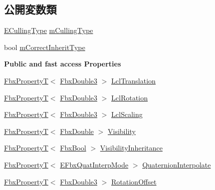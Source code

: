 \subsection*{公開変数類}
\begin{DoxyCompactItemize}
\item 
\hyperlink{class_fbx_node_afdb6d2c1708802d8b175f5094ff06046}{E\+Culling\+Type} \hyperlink{class_fbx_node_a897f88d6e23b1680d9452cd21b3d8add}{m\+Culling\+Type}
\item 
bool \hyperlink{class_fbx_node_acd21e92423faa682ac9270866e436924}{m\+Correct\+Inherit\+Type}
\end{DoxyCompactItemize}
\begin{Indent}\textbf{ Public and fast access Properties}\par
\begin{DoxyCompactItemize}
\item 
\hyperlink{class_fbx_property_t}{Fbx\+PropertyT}$<$ \hyperlink{fbxtypes_8h_ae0a96f14cde566774c7553aa7523b7a7}{Fbx\+Double3} $>$ \hyperlink{class_fbx_node_a949dfdc30869095ed26efa68674a9142}{Lcl\+Translation}
\item 
\hyperlink{class_fbx_property_t}{Fbx\+PropertyT}$<$ \hyperlink{fbxtypes_8h_ae0a96f14cde566774c7553aa7523b7a7}{Fbx\+Double3} $>$ \hyperlink{class_fbx_node_a011d40e1a84b3d64522a8ec3f20062a6}{Lcl\+Rotation}
\item 
\hyperlink{class_fbx_property_t}{Fbx\+PropertyT}$<$ \hyperlink{fbxtypes_8h_ae0a96f14cde566774c7553aa7523b7a7}{Fbx\+Double3} $>$ \hyperlink{class_fbx_node_a0a4eedf3bcdb17a7ceb8e60731f4614c}{Lcl\+Scaling}
\item 
\hyperlink{class_fbx_property_t}{Fbx\+PropertyT}$<$ \hyperlink{fbxtypes_8h_a171e72a1c46fc15c1a6c9c31948c1c5b}{Fbx\+Double} $>$ \hyperlink{class_fbx_node_a9f02f0a70b81c1a656137def3e34edb7}{Visibility}
\item 
\hyperlink{class_fbx_property_t}{Fbx\+PropertyT}$<$ \hyperlink{fbxtypes_8h_a92e0562b2fe33e76a242f498b362262e}{Fbx\+Bool} $>$ \hyperlink{class_fbx_node_a30e99c3f4d79c72bca148ea4b250f6db}{Visibility\+Inheritance}
\item 
\hyperlink{class_fbx_property_t}{Fbx\+PropertyT}$<$ \hyperlink{fbxmath_8h_a9c7a0dfb52c83256d4a92c5c6d1be72a}{E\+Fbx\+Quat\+Interp\+Mode} $>$ \hyperlink{class_fbx_node_aeeff96aed2eec641d422211a5d13a597}{Quaternion\+Interpolate}
\item 
\hyperlink{class_fbx_property_t}{Fbx\+PropertyT}$<$ \hyperlink{fbxtypes_8h_ae0a96f14cde566774c7553aa7523b7a7}{Fbx\+Double3} $>$ \hyperlink{class_fbx_node_a2e5e9ab154369d18c2495b52990436ea}{Rotation\+Offset}

\end{DoxyCompactItemize}
\end{Indent}
